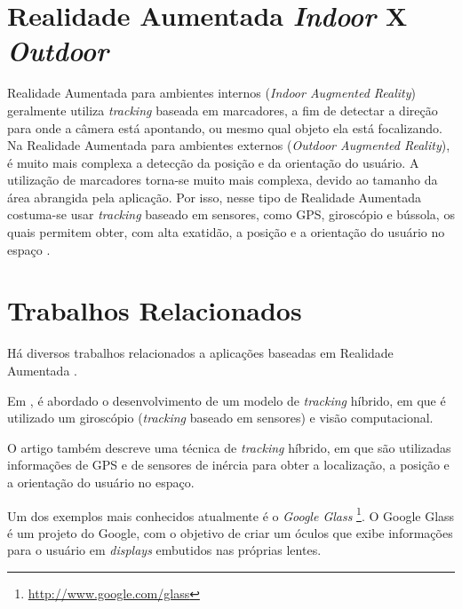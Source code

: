 \section{Realidade Aumentada \textit{Indoor} X \textit{Outdoor}}

Realidade Aumentada para ambientes internos (\textit{Indoor Augmented Reality})
geralmente utiliza \textit{tracking} baseada em marcadores, a fim de detectar
a direção para onde a câmera está apontando, ou mesmo qual objeto ela está
focalizando. Na Realidade Aumentada para ambientes externos (\textit{Outdoor Augmented Reality}),
é muito mais complexa a detecção da posição e da orientação do usuário. A utilização 
de marcadores torna-se muito mais complexa, devido ao tamanho da área abrangida pela aplicação.
Por isso, nesse tipo de Realidade Aumentada costuma-se usar \textit{tracking} baseado em sensores,
como \gls{GPS}, giroscópio e bússola, os quais permitem obter, com alta exatidão, a posição e a
orientação do usuário no espaço \cite{HybridTrackingForGIS}.





\section{Trabalhos Relacionados}
\label{sec:trab_relacionados}



Há diversos trabalhos relacionados a aplicações baseadas em Realidade
Aumentada \cite{MOOAR_Study}. 


Em \cite{HybridTrackingOutdoorAR}, é abordado o desenvolvimento de um modelo de \textit{tracking}
híbrido, em que é utilizado um giroscópio (\textit{tracking} baseado em sensores)
e visão computacional.


O artigo \cite{HybridTrackingForGIS} também descreve uma técnica de \textit{tracking} híbrido,
em que são utilizadas informações de \gls{GPS} e de sensores de inércia para obter a localização,
a posição e a orientação do usuário no espaço.


Um dos exemplos mais conhecidos atualmente é o \textit{Google Glass}
\footnote{\href{http://www.google.com/glass}{http://www.google.com/glass}}.
O Google Glass é um projeto do Google, com o objetivo de criar um óculos que exibe
informações para o usuário em \textit{displays} embutidos nas próprias lentes.

